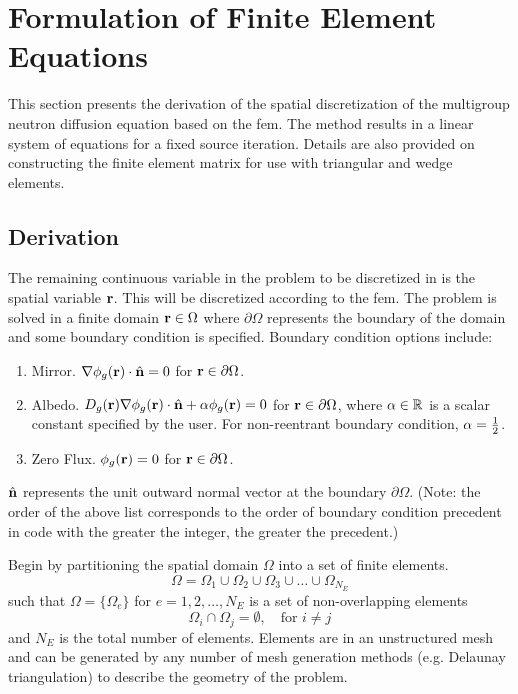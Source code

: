 \section{Formulation of Finite Element Equations}
  \label{sec:formulation}
  This section presents the derivation of the spatial discretization of the
  multigroup neutron diffusion equation based on the \gls{fem}. The method
  results in a linear system of equations for a fixed source iteration. Details
  are also provided on constructing the finite element matrix for use with
  triangular and wedge elements.

  \subsection{Derivation}
    \label{sec:formulation:derivation}
    The remaining continuous variable in the problem to be discretized in
     is the spatial variable $\mathbf{r}$. This will be 
    discretized according to the \gls{fem}. The problem is solved in a finite 
    domain $\mathbf{r} \in \Omega$ where $\partial \Omega$ represents the boundary of 
    the domain and some boundary condition is specified. Boundary condition 
    options include:
    \begin{enumerate}
      \item Mirror. $\mathbf{\nabla} \phi_g(\mathbf{r}) \cdot \hat{\mathbf{n}} = 0$ for 
        $\mathbf{r} \in \partial \Omega$.
      \item Albedo. $D_g(\mathbf{r}) \mathbf{\nabla} \phi_g(\mathbf{r}) \cdot \hat{\mathbf{n}} + 
        \alpha \phi_g(\mathbf{r})=0$ for $\mathbf{r} \in \partial \Omega$,
        where $\alpha \in \mathbb{R}$ is a scalar constant specified
        by the user. For non-reentrant boundary condition, $\alpha = \frac{1}{2}$.
      \item Zero Flux. $\phi_g(\mathbf{r}) = 0$ for $\mathbf{r} \in \partial \Omega$.
    \end{enumerate}
    $\hat{\mathbf{n}}$ represents the unit outward normal vector at the boundary $\partial
    \Omega$.
    (Note: the order of the above list corresponds to the order of boundary 
    condition precedent in code with the greater the integer, the greater the 
    precedent.)
    
    Begin by partitioning the spatial domain $\Omega$ into a set of finite 
    elements.
    \begin{equation}
      \label{eq:set_of_elements}
      \Omega = \Omega_1 \cup \Omega_2 \cup \Omega_3 \cup \ldots \cup
        \Omega_{N_E} 
    \end{equation}
    such that $\Omega = \{\Omega_e\}$ for $e = 1,2,\ldots,N_E$ is a set of
    non-overlapping elements 
    \begin{equation}
      \label{eq:non_overlapping}
      \Omega_i \cap \Omega_j = \emptyset, \quad \text{for } i \ne j
    \end{equation}
    and $N_E$ is the total number of elements. Elements are in an unstructured
    mesh and can be generated by any number of mesh generation methods (e.g.
    Delaunay triangulation) to describe the geometry of the problem.
    
